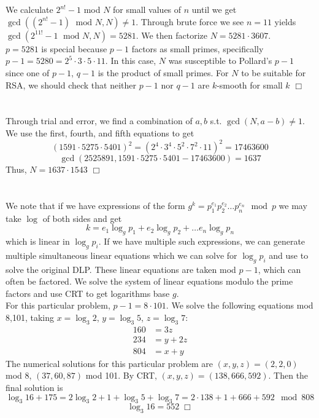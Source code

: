 \documentclass{article}
\begin{document}
\section{}
We calculate $2^{n!} -1$ mod $N$ for small values of $n$ until we get $\gcd((2^{n!} -1) \;\textrm{ mod } N,N) \neq 1$. Through brute force we see $n = 11$ yields $\gcd(2^{11!}-1 \;\textrm{ mod } N,N) = 5281$. We then factorize $N = 5281 \cdot 3607$.\\
$p = 5281$ is special because $p-1$ factors as small primes, specifically $p-1 = 5280 = 2^5 \cdot 3 \cdot 5 \cdot 11$. In this case, $N$ was susceptible to Pollard's $p-1$ since one of $p-1$, $q-1$ is the product of small primes. For $N$ to be suitable for RSA, we should check that neither $p-1$ nor $q-1$ are $k$-smooth for small $k$ $\Box$

\section{}
Through trial and error, we find a combination of $a,b$ s.t. $\gcd(N,a-b) \neq 1$. We use the first, fourth, and fifth equations to get
$$(1591 \cdot 5275 \cdot 5401)^2 = (2^4 \cdot 3^4 \cdot 5^2 \cdot 7^2 \cdot 11)^2 = 17463600$$
$$\gcd(2525891, 1591 \cdot 5275 \cdot 5401 - 17463600) = 1637$$
Thus, $N = 1637 \cdot 1543$ $\Box$

\section{}
We note that if we have expressions of the form $g^{k} = p_1^{e_1}p_2^{e_2} \dots p_n^{e_n} \mod p$ we may take $\log$ of both sides and get
$$k = e_1 \log_g p_1 + e_2 \log_g p_2 + \dots e_n \log_g p_n$$
which is linear in $\log_g p_i$. If we have multiple such expressions, we can generate multiple simultaneous linear equations which we can solve for $\log_g p_i$ and use to solve the original DLP. These linear equations are taken mod $p-1$, which can often be factored. We solve the system of linear equations modulo the prime factors and use CRT to get logarithms base $g$.\\
For this particular problem, $p-1 = 8 \cdot 101$. We solve the following equations mod 8,101, taking $x = \log_3 2$, $y = \log_3 5$, $z = \log_3 7$:
\begin{equation*}
\begin{split}
160 &= 3z\\
234 &= y + 2z\\
804 &= x + y
\end{split}
\end{equation*}
The numerical solutions for this particular problem are $(x,y,z) = (2,2,0)$ mod 8, $(37,60,87)$ mod 101. By CRT, $(x,y,z) = (138,666,592)$. Then the final solution is
$$\log_3 16 + 175 = 2 \log_3 2 + 1 + \log_3 5 + \log_3 7 = 2 \cdot 138 + 1 + 666 + 592 \mod 808$$
$$\log_3 16 = 552 \; \Box$$
\end{document}
